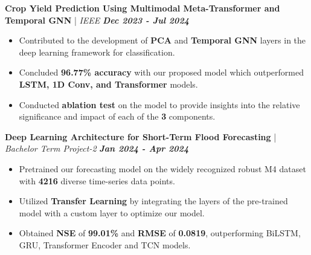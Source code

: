 \documentclass[a4paper,9pt]{extarticle}
\begin{document}
\vspace{-0.05cm}
\noindent
\textbf{Crop Yield Prediction Using Multimodal Meta-Transformer and Temporal GNN} | \textit{IEEE} \hfill \textbf{\textit{Dec 2023 - Jul 2024}} %
\vspace{-0.1cm}
\begin{itemize}
    \item Contributed to the development of \textbf{PCA} and \textbf{Temporal GNN} layers in the deep learning framework for classification.
    \item Concluded \textbf{96.77\% accuracy} with our proposed model which outperformed \textbf{LSTM, 1D Conv, and Transformer} models.
    \item Conducted \textbf{ablation test} on the model to provide insights into the relative significance and impact of each of the \textbf{3} components.
\end{itemize}

\vspace{-0.1cm}
\noindent
\textbf{Deep Learning Architecture for Short-Term Flood Forecasting} | \textit{Bachelor Term Project-2} \hfill \textbf{\textit{Jan 2024 - Apr 2024}} %
\vspace{-0.15cm}
\begin{itemize}
    \item Pretrained our forecasting model on the widely recognized robust M4 dataset with \textbf{4216} diverse time-series data points.
    \item Utilized \textbf{Transfer Learning} by integrating the layers of the pre-trained model with a custom layer to optimize our model.
    \item Obtained \textbf{NSE} of \textbf{99.01\%} and \textbf{RMSE} of \textbf{0.0819}, outperforming BiLSTM, GRU, Transformer Encoder and TCN models.
\end{itemize}

\end{document}
